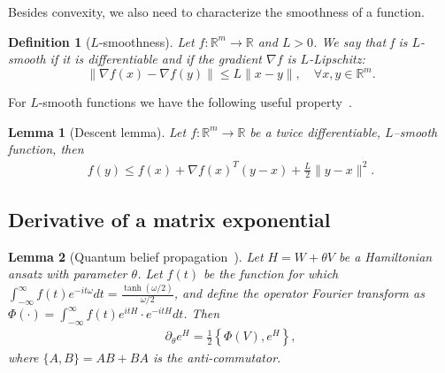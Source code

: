 \documentclass[
    reprint,
    aps,
    prx,
    longbibliography
]{revtex4-2}
\newtheorem{lemma}{Lemma}
\newtheorem{definition}{Definition}
\begin{document}
Besides convexity, we also need to characterize the smoothness of a function.

\begin{definition}[$L$-smoothness]
\label{def:smooth}
Let $f:\mathbb{R}^m \rightarrow \mathbb{R}$ and $L > 0$. We say that f is $L$-smooth if it is differentiable
and if the gradient $\nabla f$ is $L$-Lipschitz:
\begin{equation}
\| \nabla f(x) - \nabla f(y) \| \leq L \| x - y \|, \quad \forall x, y \in \mathbb{R}^m.
\end{equation}
\end{definition}

For $L$-smooth functions we have the following useful property~\cite{Garrigos2023}.

\begin{lemma}[Descent lemma]
\label{lem:descent}
Let $f: \mathbb{R}^m \rightarrow \mathbb{R}$ be a twice differentiable, $L$–smooth function, then
\begin{align}
f(y) \leq f(x) + \nabla f(x)^T (y-x) + \frac{L}{2} \| y -x \|^2 .
\end{align}
\end{lemma}

\subsection*{Derivative of a matrix exponential}

\begin{lemma}[Quantum belief propagation~\cite{Hastings_2007}] 
Let $H=W+\theta V$ be a Hamiltonian ansatz with parameter $\theta$. Let $f(t)$ be the function for which $\int_{-\infty}^\infty f(t) e^{-i t \omega} dt = \frac{\tanh(\omega/2)}{\omega/2}$, and define the operator Fourier transform as $\Phi( \cdot ) = \int_{-\infty}^{\infty} f(t) e^{itH} \cdot e^{-itH} dt$. Then
\begin{align}
\partial_\theta e^H = \frac{1}{2} \left\{ \Phi(V) , e^H\right\},
\end{align}
where $\{A, B\} = AB + BA$ is the anti-commutator.
\end{lemma}
\end{document}
